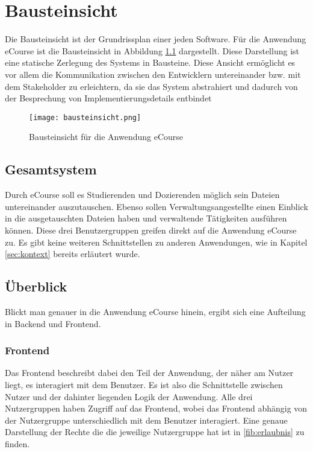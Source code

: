 \chapter{Bausteinsicht}
\label{sec:bausteine}
Die Bausteinsicht ist der Grundrissplan einer jeden Software. Für die Anwendung eCourse ist die Bausteinsicht in Abbildung \ref{fib:Bausteinsicht} dargestellt.
Diese Darstellung ist eine statische Zerlegung des Systems in Bausteine. Diese Ansicht ermöglicht es vor allem die Kommunikation zwischen den Entwicklern untereinander bzw. mit dem Stakeholder zu erleichtern, da sie das System abstrahiert und dadurch von der Besprechung von Implementierungsdetails entbindet

\begin{figure}[H]
\centering
\texttt{[image: bausteinsicht.png]}
\caption{Bausteinsicht für die Anwendung eCourse}
\label{fib:Bausteinsicht}
\end{figure}

\section{Gesamtsystem}
Durch eCourse soll es \gls{Studierende}n und \gls{Dozierende}n möglich sein Dateien untereinander auszutauschen. Ebenso sollen Verwaltungsangestellte einen Einblick in die ausgetauschten Dateien haben und verwaltende Tätigkeiten ausführen können. Diese drei Benutzergruppen greifen direkt auf die Anwendung eCourse zu. Es gibt keine weiteren Schnittstellen zu anderen Anwendungen, wie in Kapitel \ref{sec:kontext} bereits erläutert wurde. 

\section{Überblick}
Blickt man genauer in die Anwendung eCourse hinein, ergibt sich eine Aufteilung in \gls{Backend} und \gls{Frontend}.

\subsection{Frontend}
Das \gls{Frontend} beschreibt dabei den Teil der Anwendung, der näher am Nutzer liegt, es interagiert mit dem Benutzer. Es ist also die Schnittstelle zwischen Nutzer und der dahinter liegenden Logik der Anwendung. Alle drei Nutzergruppen haben Zugriff auf das \gls{Frontend}, wobei das \gls{Frontend} abhängig von der Nutzergruppe unterschiedlich mit dem Benutzer interagiert. Eine genaue Darstellung der Rechte die die jeweilige Nutzergruppe hat ist in \ref{fib:erlaubnis} zu finden.

